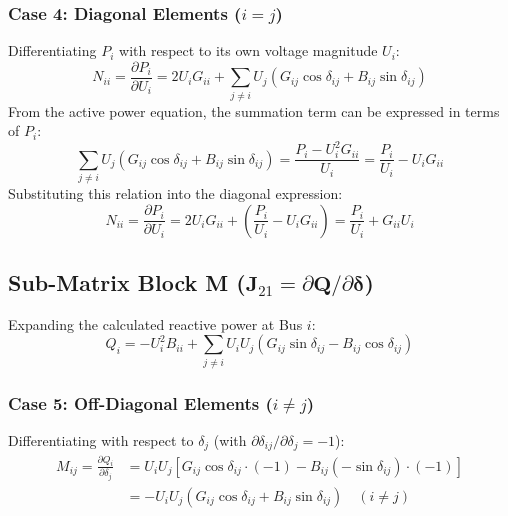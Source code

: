 \documentclass[12pt,a4paper,oneside]{report}
\begin{document}
\subsubsection{Case 4: Diagonal Elements ($i = j$)}
Differentiating $P_i$ with respect to its own voltage magnitude $U_i$:
\begin{equation}
N_{ii} = \frac{\partial P_i}{\partial U_i} = 2 U_i G_{ii} + \sum_{j \neq i} U_j (G_{ij} \cos\delta_{ij} + B_{ij} \sin\delta_{ij})
\end{equation}
From the active power equation, the summation term can be expressed in terms of $P_i$:
\begin{equation}
\sum_{j \neq i} U_j (G_{ij} \cos\delta_{ij} + B_{ij} \sin\delta_{ij}) = \frac{P_i - U_i^2 G_{ii}}{U_i} = \frac{P_i}{U_i} - U_i G_{ii}
\end{equation}
Substituting this relation into the diagonal expression:
\begin{equation}
N_{ii} = \frac{\partial P_i}{\partial U_i} = 2 U_i G_{ii} + \left( \frac{P_i}{U_i} - U_i G_{ii} \right) = \frac{P_i}{U_i} + G_{ii} U_i
\end{equation}

\subsection{Sub-Matrix Block M ($\mathbf{J}_{21} = \partial \mathbf{Q} / \partial \boldsymbol{\delta}$)}
Expanding the calculated reactive power at Bus $i$:
\begin{equation}
Q_i = -U_i^2 B_{ii} + \sum_{j \neq i} U_i U_j (G_{ij} \sin\delta_{ij} - B_{ij} \cos\delta_{ij})
\end{equation}

\subsubsection{Case 5: Off-Diagonal Elements ($i \neq j$)}
Differentiating with respect to $\delta_j$ (with $\partial \delta_{ij} / \partial \delta_j = -1$):
\begin{align}
M_{ij} = \frac{\partial Q_i}{\partial \delta_j} &= U_i U_j \left[ G_{ij} \cos\delta_{ij} \cdot (-1) - B_{ij} (-\sin\delta_{ij}) \cdot (-1) \right] \nonumber \\
&= -U_i U_j (G_{ij} \cos\delta_{ij} + B_{ij} \sin\delta_{ij}) \quad (i \neq j)
\end{align}
\end{document}
